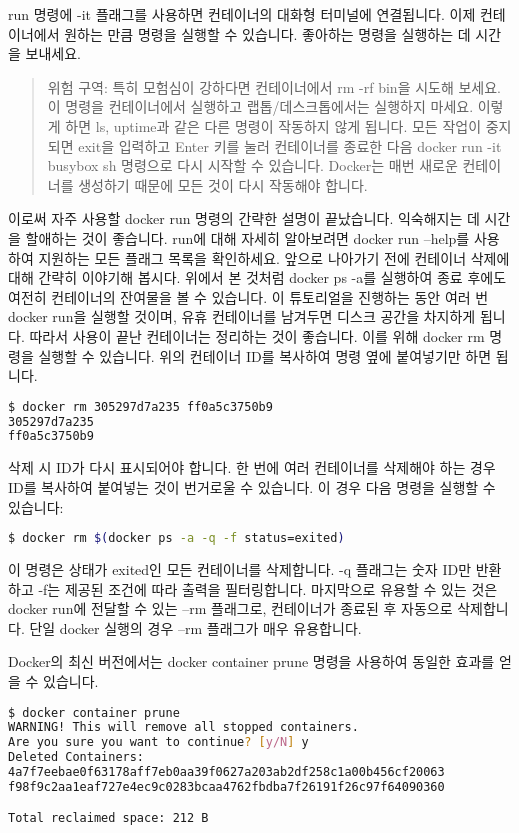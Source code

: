 run 명령에 -it 플래그를 사용하면 컨테이너의 대화형 터미널에 연결됩니다. 이제 컨테이너에서 원하는 만큼 명령을 실행할 수 있습니다. 좋아하는 명령을 실행하는 데 시간을 보내세요.
\begin{quote}
위험 구역: 특히 모험심이 강하다면 컨테이너에서 rm -rf bin을 시도해 보세요. 이 명령을 컨테이너에서 실행하고 랩톱/데스크톱에서는 실행하지 마세요. 이렇게 하면 ls, uptime과 같은 다른 명령이 작동하지 않게 됩니다. 모든 작업이 중지되면 exit을 입력하고 Enter 키를 눌러 컨테이너를 종료한 다음 docker run -it busybox sh 명령으로 다시 시작할 수 있습니다. Docker는 매번 새로운 컨테이너를 생성하기 때문에 모든 것이 다시 작동해야 합니다.
\end{quote}

이로써 자주 사용할 docker run 명령의 간략한 설명이 끝났습니다. 익숙해지는 데 시간을 할애하는 것이 좋습니다. run에 대해 자세히 알아보려면 docker run --help를 사용하여 지원하는 모든 플래그 목록을 확인하세요. 앞으로 나아가기 전에 컨테이너 삭제에 대해 간략히 이야기해 봅시다. 위에서 본 것처럼 docker ps -a를 실행하여 종료 후에도 여전히 컨테이너의 잔여물을 볼 수 있습니다. 이 튜토리얼을 진행하는 동안 여러 번 docker run을 실행할 것이며, 유휴 컨테이너를 남겨두면 디스크 공간을 차지하게 됩니다. 따라서 사용이 끝난 컨테이너는 정리하는 것이 좋습니다. 이를 위해 docker rm 명령을 실행할 수 있습니다. 위의 컨테이너 ID를 복사하여 명령 옆에 붙여넣기만 하면 됩니다.
\begin{lstlisting}[language=bash]
$ docker rm 305297d7a235 ff0a5c3750b9
305297d7a235
ff0a5c3750b9
\end{lstlisting}

삭제 시 ID가 다시 표시되어야 합니다. 한 번에 여러 컨테이너를 삭제해야 하는 경우 ID를 복사하여 붙여넣는 것이 번거로울 수 있습니다. 이 경우 다음 명령을 실행할 수 있습니다:
\begin{lstlisting}[language=bash]
$ docker rm $(docker ps -a -q -f status=exited)
\end{lstlisting}

이 명령은 상태가 exited인 모든 컨테이너를 삭제합니다. -q 플래그는 숫자 ID만 반환하고 -f는 제공된 조건에 따라 출력을 필터링합니다. 마지막으로 유용할 수 있는 것은 docker run에 전달할 수 있는 --rm 플래그로, 컨테이너가 종료된 후 자동으로 삭제합니다. 단일 docker 실행의 경우 --rm 플래그가 매우 유용합니다.

Docker의 최신 버전에서는 docker container prune 명령을 사용하여 동일한 효과를 얻을 수 있습니다.
\begin{lstlisting}[language=bash]
$ docker container prune
WARNING! This will remove all stopped containers.
Are you sure you want to continue? [y/N] y
Deleted Containers:
4a7f7eebae0f63178aff7eb0aa39f0627a203ab2df258c1a00b456cf20063
f98f9c2aa1eaf727e4ec9c0283bcaa4762fbdba7f26191f26c97f64090360

Total reclaimed space: 212 B
\end{lstlisting}


